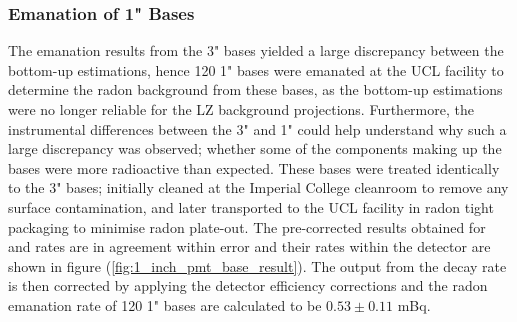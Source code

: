 \subsubsection{Emanation of 1" Bases}

The emanation results from the 3" bases yielded a large discrepancy between the bottom-up estimations, hence 120 1" bases were emanated at the UCL facility to determine the radon background from these bases, as the bottom-up estimations were no longer reliable for the LZ background projections. Furthermore, the instrumental differences between the 3" and 1" could help understand why such a large discrepancy was observed; whether some of the components making up the bases were more radioactive than expected. These bases were treated identically to the 3" bases; initially cleaned at the Imperial College cleanroom to remove any surface contamination, and later transported to the UCL facility in radon tight packaging to minimise radon plate-out. The pre-corrected results obtained for \PoTOF{} and \PoTOE{} rates are in agreement within error and their rates within the detector are shown in figure (\ref{fig:1_inch_pmt_base_result}). The output from the \PoTOF{} decay rate is then corrected by applying the detector efficiency corrections and the radon emanation rate of 120 1" bases are calculated to be $0.53\pm0.11$ mBq. 
%
